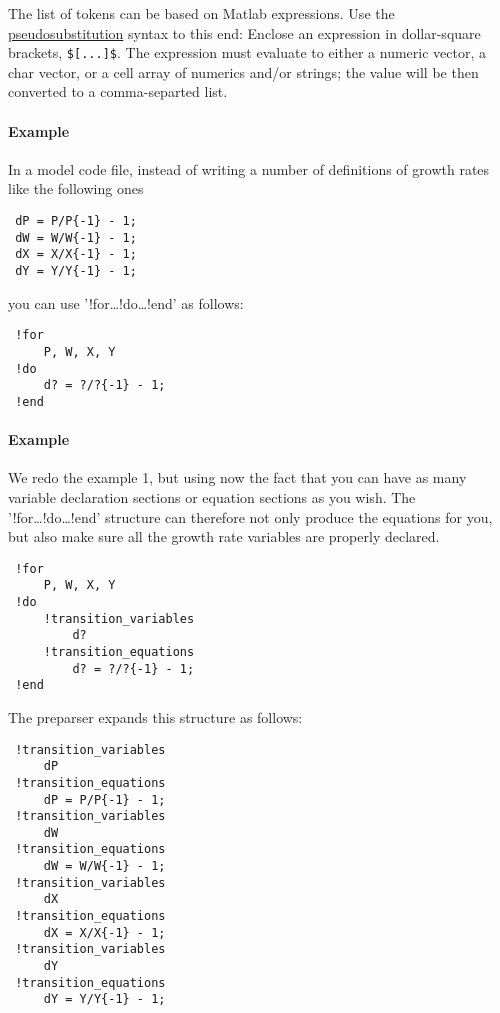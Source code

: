  The list of tokens can be based on Matlab expressions. Use the
 \href{modellang/pseudosubs}{pseudosubstitution} syntax to this end:
 Enclose an expression in dollar-square brackets, \texttt{\${[}...{]}\$}.
 The expression must evaluate to either a numeric vector, a char vector,
 or a cell array of numerics and/or strings; the value will be then
 converted to a comma-separted list.
 
 \paragraph{Example}
 
 In a model code file, instead of writing a number of definitions of
 growth rates like the following ones
 
 \begin{verbatim}
 dP = P/P{-1} - 1;
 dW = W/W{-1} - 1;
 dX = X/X{-1} - 1;
 dY = Y/Y{-1} - 1;
 \end{verbatim}
 
 you can use '!for\ldots{}!do\ldots{}!end' as follows:
 
 \begin{verbatim}
 !for
     P, W, X, Y
 !do
     d? = ?/?{-1} - 1;
 !end
 \end{verbatim}
 
 \paragraph{Example}
 
 We redo the example 1, but using now the fact that you can have as many
 variable declaration sections or equation sections as you wish. The
 '!for\ldots{}!do\ldots{}!end' structure can therefore not only produce
 the equations for you, but also make sure all the growth rate variables
 are properly declared.
 
 \begin{verbatim}
 !for
     P, W, X, Y
 !do
     !transition_variables
         d?
     !transition_equations
         d? = ?/?{-1} - 1;
 !end
 \end{verbatim}
 
 The preparser expands this structure as follows:
 
 \begin{verbatim}
 !transition_variables
     dP
 !transition_equations
     dP = P/P{-1} - 1;
 !transition_variables
     dW
 !transition_equations
     dW = W/W{-1} - 1;
 !transition_variables
     dX
 !transition_equations
     dX = X/X{-1} - 1;
 !transition_variables
     dY
 !transition_equations
     dY = Y/Y{-1} - 1;
 \end{verbatim}
 

